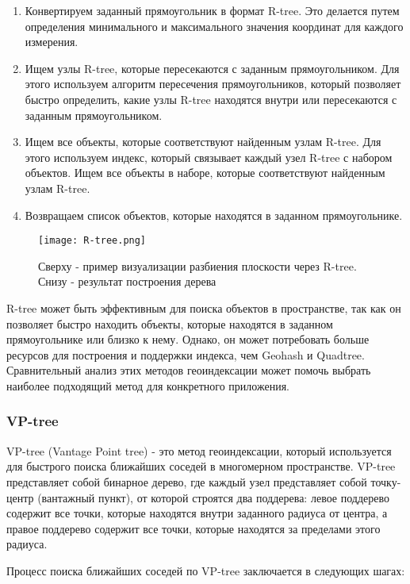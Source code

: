 \begin{enumerate}
    \item Конвертируем заданный прямоугольник в формат R-tree. Это делается путем определения минимального и максимального значения координат для каждого измерения.
    \item Ищем узлы R-tree, которые пересекаются с заданным прямоугольником. Для этого используем алгоритм пересечения прямоугольников, который позволяет быстро определить, какие узлы R-tree находятся внутри или пересекаются с заданным прямоугольником.
    \item Ищем все объекты, которые соответствуют найденным узлам R-tree. Для этого используем индекс, который связывает каждый узел R-tree с набором объектов. Ищем все объекты в наборе, которые соответствуют найденным узлам R-tree.
    \item Возвращаем список объектов, которые находятся в заданном прямоугольнике.
\end{enumerate}

\begin{figure}[h]
    \centering
    \texttt{[image: R-tree.png]}
    \caption{Сверху - пример визуализации разбиения плоскости через R-tree. Снизу - результат построения дерева}
\end{figure}

R-tree может быть эффективным для поиска объектов в пространстве, так как он позволяет быстро находить объекты, которые находятся в заданном прямоугольнике или близко к нему. Однако, он может потребовать больше ресурсов для построения и поддержки индекса, чем Geohash и Quadtree. Сравнительный анализ этих методов геоиндексации может помочь выбрать наиболее подходящий метод для конкретного приложения.

\subsubsection{VP-tree}
VP-tree (Vantage Point tree) - это метод геоиндексации, который используется для быстрого поиска ближайших соседей в многомерном пространстве. VP-tree представляет собой бинарное дерево, где каждый узел представляет собой точку-центр (вантажный пункт), от которой строятся два поддерева: левое поддерево содержит все точки, которые находятся внутри заданного радиуса от центра, а правое поддерево содержит все точки, которые находятся за пределами этого радиуса.

Процесс поиска ближайших соседей по VP-tree заключается в следующих шагах:

